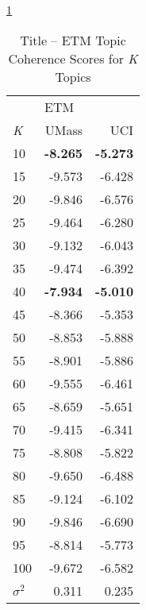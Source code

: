 \documentclass[letterpaper,12pt]{article}
\begin{document}
\ref{tab:etm_title_tc}
\begin{table}
	\caption{\label{tab:etm_title_tc} Title -- ETM Topic Coherence Scores for \emph{K} Topics}
	\begin{center}
		\begin{tabular}{lrr}
			\toprule
			{} & \multicolumn{2}{l}{ETM} \\
			\emph{K} &  UMass &    UCI \\
			\midrule
			10  & \textbf{-8.265} & \textbf{-5.273} \\
			15  & -9.573 & -6.428 \\
			20  & -9.846 & -6.576 \\
			25  & -9.464 & -6.280 \\
			30  & -9.132 & -6.043 \\
			35  & -9.474 & -6.392 \\
			40  & \textbf{-7.934} & \textbf{-5.010} \\
			45  & -8.366 & -5.353 \\
			50  & -8.853 & -5.888 \\
			55  & -8.901 & -5.886 \\
			60  & -9.555 & -6.461 \\
			65  & -8.659 & -5.651 \\
			70  & -9.415 & -6.341 \\
			75  & -8.808 & -5.822 \\
			80  & -9.650 & -6.488 \\
			85  & -9.124 & -6.102 \\
			90  & -9.846 & -6.690 \\
			95  & -8.814 & -5.773 \\
			100 & -9.672 & -6.582 \\
			\midrule
			$\sigma^2$ & 0.311 & 0.235 \\
			\bottomrule
			\end{tabular}
	\end{center}
\end{table}
\end{document}
